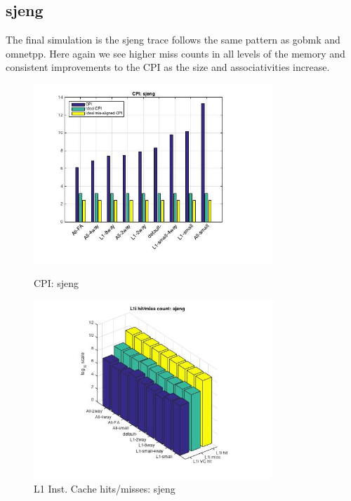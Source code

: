 \documentclass[11pt,titlepage]{article}
\begin{document}
    \subsection{sjeng}
    The final simulation is the sjeng trace follows the same pattern as gobmk and omnetpp. Here again we see higher miss counts in all levels of the memory and consistent improvements to the CPI as the size and associativities increase. 
        \begin{figure}[H]
      \centering
      \begin{minipage}{.45\textwidth}
      \includegraphics[width=9cm]{CPIsjeng}
      \caption{CPI: sjeng}
      \label{fig:CPIsjeng}
      \end{minipage}
      \begin{minipage}{.45\textwidth}
            \includegraphics[width=9cm]{L1IHM_sjeng}
            \caption{L1 Inst. Cache hits/misses: sjeng}
            \label{fig:L1IHM_sjeng}
          \end{minipage}%
           \end{figure}
\end{document}
